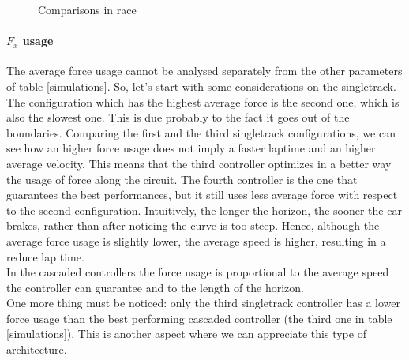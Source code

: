 \documentclass[a4paper, onecolumn, 11pt]{article}
\begin{document}
\begin{figure}[H]
\begin{subfigure}{0.8\textwidth}
        \label{race5}
    \end{subfigure}
    \caption[short]{Comparisons in race}
    \label{race_ippodromo}
\end{figure}

\paragraph{$F_x$ usage } \label{force_usage} The average force usage cannot be
analysed separately from the other parameters of table \ref{simulations}. So,
let's start with some considerations on the singletrack. The configuration which
has the highest average force is the second one, which is also the slowest one.
This is due probably to the fact it goes out of the boundaries. Comparing the
first and the third singletrack configurations, we can see how an higher force
usage does not imply a faster laptime and an higher average velocity. This means
that the third controller optimizes in a better way the usage of force along the
circuit. The fourth controller is the one that guarantees the best performances,
but it still uses less average force with respect to the second configuration.
Intuitively, the longer the horizon, the sooner the car brakes, rather than
after noticing the curve is too steep. Hence, although the average force usage
is slightly lower, the average speed is higher, resulting in a reduce lap
time.\\
In the cascaded controllers the force usage is proportional to the average speed
the controller can guarantee and to the length of the horizon. \\
One more thing must be noticed: only the third singletrack controller has a lower force usage
than the best performing cascaded controller (the third one in table \ref{simulations}).
This is another aspect where we can appreciate this type of architecture.
\end{document}
